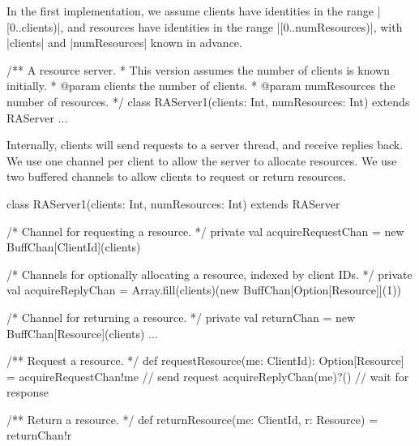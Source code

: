 
\begin{slide}

In the first implementation, we assume clients have identities in the range
|[0..clients)|, and resources have identities in the range
  |[0..numResources)|, with |clients| and |numResources| known in advance.
%
\begin{scala}
/** A resource server. 
  * This version assumes the number of clients is known initially. 
  * @param clients the number of clients.
  * @param numResources the number of resources.  */
class RAServer1(clients: Int, numResources: Int) extends RAServer{
  ...
}
\end{scala}
\end{slide}


\begin{slide}

Internally, clients will send requests to a server thread, and receive replies
back. 
%
We use one channel per client to allow the server to allocate resources.  We
use two buffered channels to allow clients to request or return resources.
%
\begin{scala}
class RAServer1(clients: Int, numResources: Int) extends RAServer{
  /* Channel for requesting a resource. */
  private val acquireRequestChan = new BuffChan[ClientId](clients)

  /* Channels for optionally allocating a resource, indexed by client IDs. */
  private val acquireReplyChan = 
    Array.fill(clients)(new BuffChan[Option[Resource]](1))

  /* Channel for returning a resource. */
  private val returnChan = new BuffChan[Resource](clients)
  ...
}
\end{scala}
\end{slide}


\begin{slide}

\begin{scala}
  /** Request a resource. */
  def requestResource(me: ClientId): Option[Resource] = {
    acquireRequestChan!me  // send request
    acquireReplyChan(me)?() // wait for response
  }

  /** Return a resource. */
  def returnResource(me: ClientId, r: Resource) = returnChan!r
\end{scala}
\end{slide}


